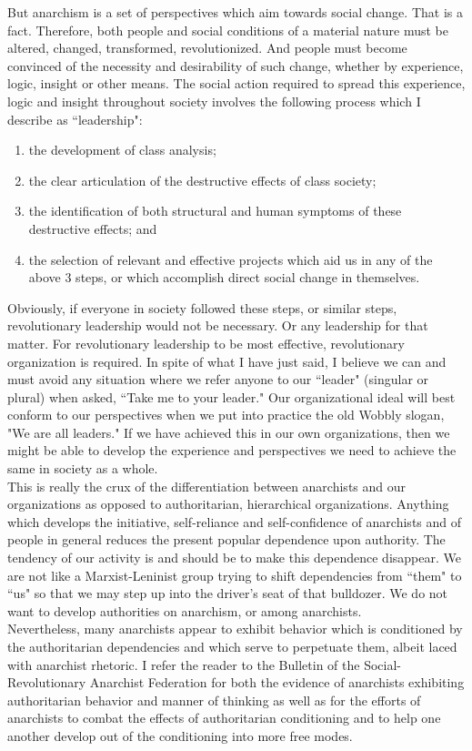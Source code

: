 \documentclass[12pt, onecolumn, letterpaper, oneside]{book}
\begin{document}
But anarchism is a set of perspectives which aim towards social change. That is a fact. Therefore, both people and social conditions of a material nature must be altered, changed, transformed, revolutionized. And people must become convinced of the necessity and desirability of such change, whether by experience, logic, insight or other means. The social action required to spread this experience, logic and insight throughout society involves the following process which I describe as ``leadership":
\begin{enumerate}
\item the development of class analysis;
\item the clear articulation of the destructive effects of class society;
\item the identification of both structural and human symptoms of these destructive effects; and
\item the selection of relevant and effective projects which aid us in any of the above 3 steps, or which accomplish direct social change in themselves.
\end{enumerate}
Obviously, if everyone in society followed these steps, or similar steps, revolutionary leadership would not be necessary. Or any leadership for that matter. For revolutionary leadership to be most effective, revolutionary organization is required. In spite of what I have just said, I believe we can and must avoid any situation where we refer anyone to our ``leader" (singular or plural) when asked, ``Take me to your leader." Our organizational ideal will best conform to our perspectives when we put into practice the old Wobbly slogan, "We are all leaders." If we have achieved this in our own organizations, then we might be able to develop the experience and perspectives we need to achieve the same in society as a whole.\\
This is really the crux of the differentiation between anarchists and our organizations as opposed to authoritarian, hierarchical organizations. Anything which develops the initiative, self-reliance and self-confidence of anarchists and of people in general reduces the present popular dependence upon authority. The tendency of our activity is and should be to make this dependence disappear. We are not like a Marxist-Leninist group trying to shift dependencies from ``them" to ``us" so that we may step up into the driver's seat of that bulldozer. We do not want to develop authorities on anarchism, or among anarchists.\\
Nevertheless, many anarchists appear to exhibit behavior which is conditioned by the authoritarian dependencies and which serve to perpetuate them, albeit laced with anarchist rhetoric. I refer the reader to the Bulletin of the Social-Revolutionary Anarchist Federation for both the evidence of anarchists exhibiting authoritarian behavior and manner of thinking as well as for the efforts of anarchists to combat the effects of authoritarian conditioning and to help one another develop out of the conditioning into more free modes.\\
\end{document}
